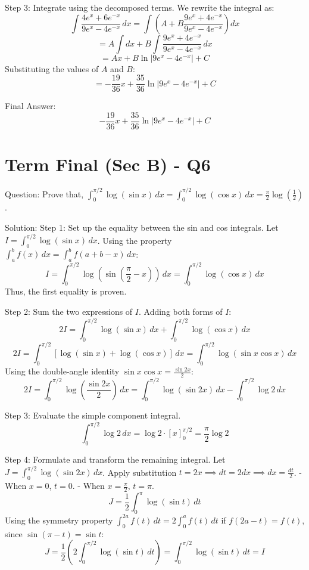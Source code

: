 \documentclass{article}
\begin{document}
Step 3: Integrate using the decomposed terms.
We rewrite the integral as:
\[
\int \frac{4e^x + 6e^{-x}}{9e^x - 4e^{-x}} \, dx = \int \left( A + B \frac{9e^x + 4e^{-x}}{9e^x - 4e^{-x}} \right) dx
\]
\[
= A \int dx + B \int \frac{9e^x + 4e^{-x}}{9e^x - 4e^{-x}} \, dx
\]
\[
= Ax + B \ln|9e^x - 4e^{-x}| + C
\]
Substituting the values of $A$ and $B$:
\[
= -\frac{19}{36}x + \frac{35}{36}\ln|9e^x - 4e^{-x}| + C
\]

Final Answer:
\[
\boxed{-\frac{19}{36}x + \frac{35}{36}\ln|9e^x - 4e^{-x}| + C}
\]

\section*{Term Final (Sec B) - Q6}
Question:
Prove that, $\int_0^{\pi/2} \log(\sin x) \, dx = \int_0^{\pi/2} \log(\cos x) \, dx = \frac{\pi}{2} \log\left(\frac{1}{2}\right)$.

Solution:
Step 1: Set up the equality between the sin and cos integrals.
Let $I = \int_0^{\pi/2} \log(\sin x) \, dx$.
Using the property $\int_a^b f(x) \, dx = \int_a^b f(a+b-x) \, dx$:
\[
I = \int_0^{\pi/2} \log\left(\sin\left(\frac{\pi}{2} - x\right)\right) \, dx = \int_0^{\pi/2} \log(\cos x) \, dx
\]
Thus, the first equality is proven.

Step 2: Sum the two expressions of $I$.
Adding both forms of $I$:
\[
2I = \int_0^{\pi/2} \log(\sin x) \, dx + \int_0^{\pi/2} \log(\cos x) \, dx
\]
\[
2I = \int_0^{\pi/2} \left[ \log(\sin x) + \log(\cos x) \right] \, dx = \int_0^{\pi/2} \log(\sin x \cos x) \, dx
\]
Using the double-angle identity $\sin x \cos x = \frac{\sin 2x}{2}$:
\[
2I = \int_0^{\pi/2} \log\left(\frac{\sin 2x}{2}\right) \, dx = \int_0^{\pi/2} \log(\sin 2x) \, dx - \int_0^{\pi/2} \log 2 \, dx
\]

Step 3: Evaluate the simple component integral.
\[
\int_0^{\pi/2} \log 2 \, dx = \log 2 \cdot [x]_0^{\pi/2} = \frac{\pi}{2} \log 2
\]

Step 4: Formulate and transform the remaining integral.
Let $J = \int_0^{\pi/2} \log(\sin 2x) \, dx$.
Apply substitution $t = 2x \implies dt = 2dx \implies dx = \frac{dt}{2}$.
- When $x = 0$, $t = 0$.
- When $x = \frac{\pi}{2}$, $t = \pi$.
\[
J = \frac{1}{2} \int_0^{\pi} \log(\sin t) \, dt
\]
Using the symmetry property $\int_0^{2a} f(t) \, dt = 2\int_0^a f(t) \, dt$ if $f(2a-t) = f(t)$, since $\sin(\pi - t) = \sin t$:
\[
J = \frac{1}{2} \left( 2 \int_0^{\pi/2} \log(\sin t) \, dt \right) = \int_0^{\pi/2} \log(\sin t) \, dt = I
\]
\end{document}
